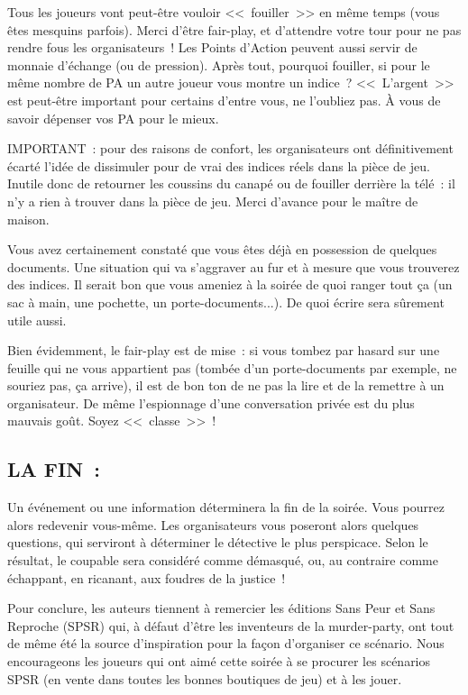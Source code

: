 \documentclass[14pt,twocolumn]{extarticle}
\begin{document}
Tous les joueurs vont peut-être vouloir <<~fouiller~>> en même temps (vous êtes
mesquins parfois). Merci d'être fair-play, et d'attendre votre tour pour ne pas
rendre fous les organisateurs~! Les Points d'Action peuvent aussi servir de
monnaie d'échange (ou de pression). Après tout, pourquoi fouiller, si pour le
même nombre de PA un autre joueur vous montre un indice~? <<~L'argent~>> est
peut-être important pour certains d'entre vous, ne l'oubliez pas. À vous de
savoir dépenser vos PA pour le mieux.

IMPORTANT~: pour des raisons de confort, les organisateurs ont définitivement
écarté l'idée de dissimuler pour de vrai des indices réels dans la pièce de
jeu. Inutile donc de retourner les coussins du canapé ou de fouiller derrière
la télé~: il n'y a rien à trouver dans la pièce de jeu. Merci d'avance pour le
maître de maison.

Vous avez certainement constaté que vous êtes déjà en possession de quelques
documents. Une situation qui va s'aggraver au fur et à mesure que vous
trouverez des indices. Il serait bon que vous ameniez à la soirée de quoi
ranger tout ça (un sac à main, une pochette, un porte-documents...). De quoi
écrire sera sûrement utile aussi.

Bien évidemment, le fair-play est de mise~: si vous tombez par hasard sur une
feuille qui ne vous appartient pas (tombée d'un porte-documents par exemple, ne
souriez pas, ça arrive), il est de bon ton de ne pas la lire et de la remettre
à un organisateur. De même l'espionnage d'une conversation privée est du plus
mauvais goût. Soyez <<~classe~>>~!

\subsection{LA FIN~:}

Un événement ou une information déterminera la fin de la soirée. Vous pourrez
alors redevenir vous-même. Les organisateurs vous poseront alors quelques
questions, qui serviront à déterminer le détective le plus perspicace. Selon le
résultat, le coupable sera considéré comme démasqué, ou, au contraire comme
échappant, en ricanant, aux foudres de la justice~!

Pour conclure, les auteurs tiennent à remercier les éditions Sans Peur et Sans
Reproche (SPSR) qui, à défaut d'être les inventeurs de la murder-party, ont
tout de même été la source d'inspiration pour la façon d'organiser ce scénario.
Nous encourageons les joueurs qui ont aimé cette soirée à se procurer les
scénarios SPSR (en vente dans toutes les bonnes boutiques de jeu) et à les
jouer.  
\framebox[\columnwidth]{}
\end{document}

